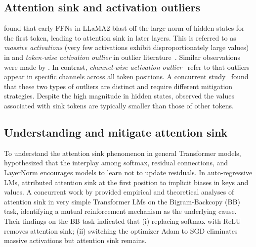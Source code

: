 \subsection{Attention sink and activation outliers}
\vspace{-0.05cm}
\citet{cancedda2024spectral} found that early FFNs in LLaMA2 blast off the large norm of hidden states for the first token, leading to attention sink in later layers. This is referred to as \textit{massive activations} (very few activations exhibit disproportionately large values) in \citet{sun2024massive} and \textit{token-wise activation outlier} in outlier literature~\citep{lin2024duquant}. Similar observations were made by \citet{bondarenko2023quantizable}. In contrast, \textit{channel-wise activation outlier}~\citep{dettmers2022gpt3, xiao2023smoothquant} refer to that outliers appear in specific channels across all token positions. A concurrent study~\citep{kaul2024attention} found that these two types of outliers are distinct and require different mitigation strategies. Despite the high magnitude in hidden states, \citet{bondarenko2023quantizable, guo2024attention} observed the values associated with sink tokens are typically smaller than those of other tokens.

\vspace{-0.05cm}
\subsection{Understanding and mitigate attention sink}
\vspace{-0.05cm}
To understand the attention sink phenomenon in general Transformer models, \citet{bondarenko2023quantizable} hypothesized that the interplay among softmax, residual connections, and LayerNorm encourages models to learn not to update residuals. In auto-regressive LMs, \citet{sun2024massive} attributed attention sink at the first position to implicit biases in keys and values. A concurrent work by \citet{guo2024active} provided empirical and theoretical analyses of attention sink in very simple Transformer LMs on the Bigram-Backcopy (BB) task, identifying a mutual reinforcement mechanism as the underlying cause. Their findings on the BB task indicated that (i) replacing softmax with ReLU removes attention sink; (ii) switching the optimizer Adam to SGD eliminates massive activations but attention sink remains. 

